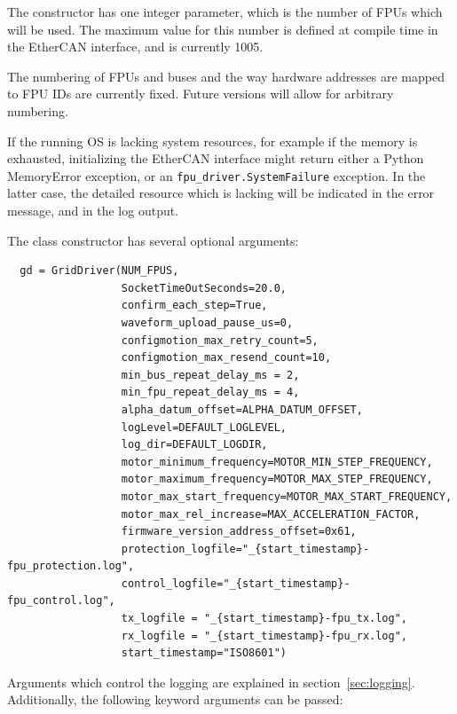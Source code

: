 \documentclass[fontsize=12,a4paper]{scrreprt}
\begin{document}
The constructor has one integer parameter, which is the
number of FPUs which will be used. The maximum value for this number
is defined at compile time in the EtherCAN interface, and is currently 1005.

The numbering of FPUs and buses and the way hardware addresses are
mapped to FPU IDs are currently fixed. Future versions will allow for
arbitrary numbering.

\begin{sloppypar}
If the running OS is lacking system resources, for example if the
memory is exhausted, initializing the EtherCAN interface might return either a
Python MemoryError exception, or an
\texttt{fpu\_driver.SystemFailure} exception. In the latter case,
the detailed resource which is lacking will be indicated in the error
message, and in the log output.
\end{sloppypar}

\label{sec:driverparams}
The class constructor has several optional arguments:
\begin{verbatim}
  gd = GridDriver(NUM_FPUS,
                  SocketTimeOutSeconds=20.0,
                  confirm_each_step=True,
                  waveform_upload_pause_us=0,
                  configmotion_max_retry_count=5,
                  configmotion_max_resend_count=10,
                  min_bus_repeat_delay_ms = 2,
                  min_fpu_repeat_delay_ms = 4,
                  alpha_datum_offset=ALPHA_DATUM_OFFSET,
                  logLevel=DEFAULT_LOGLEVEL,
                  log_dir=DEFAULT_LOGDIR,
                  motor_minimum_frequency=MOTOR_MIN_STEP_FREQUENCY,
                  motor_maximum_frequency=MOTOR_MAX_STEP_FREQUENCY,
                  motor_max_start_frequency=MOTOR_MAX_START_FREQUENCY,
                  motor_max_rel_increase=MAX_ACCELERATION_FACTOR,
                  firmware_version_address_offset=0x61,
                  protection_logfile="_{start_timestamp}-fpu_protection.log",
                  control_logfile="_{start_timestamp}-fpu_control.log",
                  tx_logfile = "_{start_timestamp}-fpu_tx.log",
                  rx_logfile = "_{start_timestamp}-fpu_rx.log",
                  start_timestamp="ISO8601")
\end{verbatim}



Arguments which
control the logging are explained in section~\ref{sec:logging}.
Additionally, the following keyword arguments can
be passed:
\end{document}
